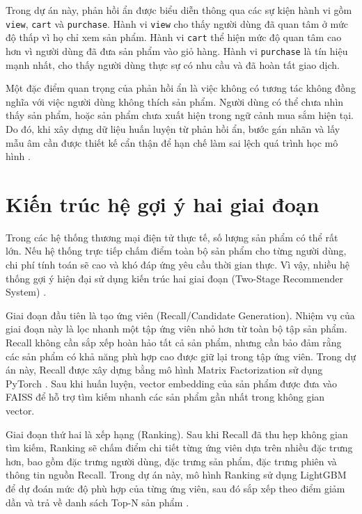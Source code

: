 Trong dự án này, phản hồi ẩn được biểu diễn thông qua các sự kiện hành vi gồm \colorbox{gray!15}{\texttt{view}}, \colorbox{gray!15}{\texttt{cart}} và \colorbox{gray!15}{\texttt{purchase}}. Hành vi \colorbox{gray!15}{\texttt{view}} cho thấy người dùng đã quan tâm ở mức độ thấp vì họ chỉ xem sản phẩm. Hành vi \colorbox{gray!15}{\texttt{cart}} thể hiện mức độ quan tâm cao hơn vì người dùng đã đưa sản phẩm vào giỏ hàng. Hành vi \colorbox{gray!15}{\texttt{purchase}} là tín hiệu mạnh nhất, cho thấy người dùng thực sự có nhu cầu và đã hoàn tất giao dịch.
\medskip

Một đặc điểm quan trọng của phản hồi ẩn là việc không có tương tác không đồng nghĩa với việc người dùng không thích sản phẩm. Người dùng có thể chưa nhìn thấy sản phẩm, hoặc sản phẩm chưa xuất hiện trong ngữ cảnh mua sắm hiện tại. Do đó, khi xây dựng dữ liệu huấn luyện từ phản hồi ẩn, bước gán nhãn và lấy mẫu âm cần được thiết kế cẩn thận để hạn chế làm sai lệch quá trình học mô hình \cite{rendle2009bpr}.

\section{Kiến trúc hệ gợi ý hai giai đoạn}
Trong các hệ thống thương mại điện tử thực tế, số lượng sản phẩm có thể rất lớn. Nếu hệ thống trực tiếp chấm điểm toàn bộ sản phẩm cho từng người dùng, chi phí tính toán sẽ cao và khó đáp ứng yêu cầu thời gian thực. Vì vậy, nhiều hệ thống gợi ý hiện đại sử dụng kiến trúc hai giai đoạn (Two-Stage Recommender System) \cite{covington2016deep}.
\medskip

Giai đoạn đầu tiên là tạo ứng viên (Recall/Candidate Generation). Nhiệm vụ của giai đoạn này là lọc nhanh một tập ứng viên nhỏ hơn từ toàn bộ tập sản phẩm. Recall không cần sắp xếp hoàn hảo tất cả sản phẩm, nhưng cần bảo đảm rằng các sản phẩm có khả năng phù hợp cao được giữ lại trong tập ứng viên. Trong dự án này, Recall được xây dựng bằng mô hình Matrix Factorization sử dụng PyTorch \cite{paszke2019pytorch}. Sau khi huấn luyện, vector embedding của sản phẩm được đưa vào FAISS để hỗ trợ tìm kiếm nhanh các sản phẩm gần nhất trong không gian vector.
\medskip

Giai đoạn thứ hai là xếp hạng (Ranking). Sau khi Recall đã thu hẹp không gian tìm kiếm, Ranking sẽ chấm điểm chi tiết từng ứng viên dựa trên nhiều đặc trưng hơn, bao gồm đặc trưng người dùng, đặc trưng sản phẩm, đặc trưng phiên và thông tin nguồn Recall. Trong dự án này, mô hình Ranking sử dụng LightGBM để dự đoán mức độ phù hợp của từng ứng viên, sau đó sắp xếp theo điểm giảm dần và trả về danh sách Top-N sản phẩm \cite{ke2017lightgbm}.

